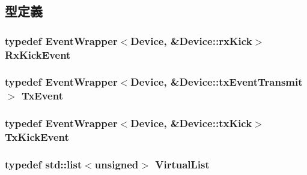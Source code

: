 \subsection{型定義}
\hypertarget{classSinic_1_1Device_a1094ea52a2a9cb27d833549a0407932d}{
\subsubsection[{RxKickEvent}]{\setlength{\rightskip}{0pt plus 5cm}typedef {\bf EventWrapper}$<${\bf Device}, \&Device::rxKick$>$ {\bf RxKickEvent}}}
\label{classSinic_1_1Device_a1094ea52a2a9cb27d833549a0407932d}
\hypertarget{classSinic_1_1Device_a9a650a51d23bb10d0de3cb621d918e50}{
\subsubsection[{TxEvent}]{\setlength{\rightskip}{0pt plus 5cm}typedef {\bf EventWrapper}$<${\bf Device}, \&Device::txEventTransmit$>$ {\bf TxEvent}}}
\label{classSinic_1_1Device_a9a650a51d23bb10d0de3cb621d918e50}
\hypertarget{classSinic_1_1Device_ad902ad2446ba2b0506a150072f971da5}{
\subsubsection[{TxKickEvent}]{\setlength{\rightskip}{0pt plus 5cm}typedef {\bf EventWrapper}$<${\bf Device}, \&Device::txKick$>$ {\bf TxKickEvent}}}
\label{classSinic_1_1Device_ad902ad2446ba2b0506a150072f971da5}
\hypertarget{classSinic_1_1Device_a825103ea4ae04062ca13fa65d29bcfc6}{
\subsubsection[{VirtualList}]{\setlength{\rightskip}{0pt plus 5cm}typedef {\bf std::list}$<$unsigned$>$ {\bf VirtualList}}}
